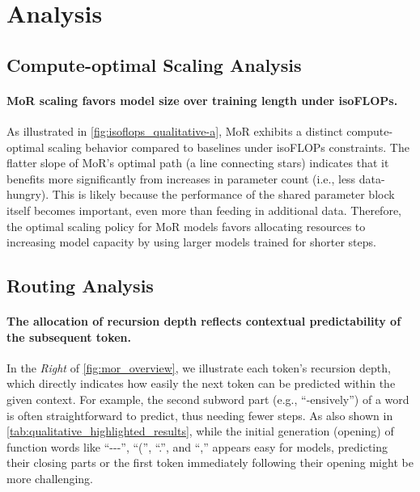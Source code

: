 \vspace{-3pt}
\section{Analysis}


\vspace{-1pt}
\subsection{Compute-optimal Scaling Analysis}
\label{subsec:scaling_analysis}





\paragraph{MoR scaling favors model size over training length under isoFLOPs.}


As illustrated in \autoref{fig:isoflops_qualitative-a}, MoR exhibits a distinct compute-optimal scaling behavior compared to baselines under isoFLOPs constraints. The flatter slope of MoR's optimal path (a line connecting stars) indicates that it benefits more significantly from increases in parameter count (i.e., less data-hungry). This is likely because the performance of the shared parameter block itself becomes important, even more than feeding in additional data. Therefore, the optimal scaling policy for MoR models favors allocating resources to increasing model capacity by using larger models trained for shorter steps.


\vspace{-3pt}
\subsection{Routing Analysis}


\paragraph{The allocation of recursion depth reflects contextual predictability of the subsequent token.}

In the \textit{Right} of \autoref{fig:mor_overview}, we illustrate each token's recursion depth, which directly indicates how easily the next token can be predicted within the given context. For example, the second subword part (e.g., ``-ensively'') of a word is often straightforward to predict, thus needing fewer steps. As also shown in \autoref{tab:qualitative_highlighted_results}, while the initial generation (opening) of function words like ``{-}{-}{-}'', ``('', ``.'', and ``,'' appears easy for models, predicting their closing parts or the first token immediately following their opening might be more challenging.

